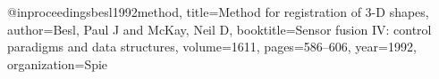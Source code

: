 @inproceedings{besl1992method,
  title={Method for registration of 3-D shapes},
  author={Besl, Paul J and McKay, Neil D},
  booktitle={Sensor fusion IV: control paradigms and data structures},
  volume={1611},
  pages={586--606},
  year={1992},
  organization={Spie}
}